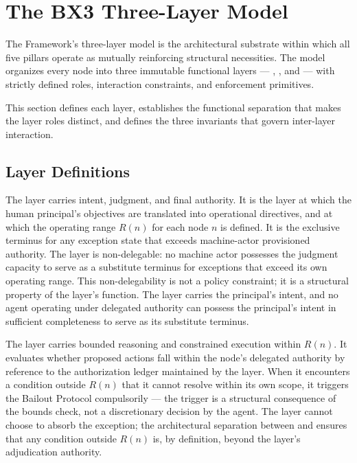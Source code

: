 \section{The BX3 Three-Layer Model}\label{sec:three-layer-model}

The \bxthree{} Framework's three-layer model is the architectural substrate
within which all five pillars operate as mutually reinforcing structural
necessities.  The model organizes every node into three immutable functional
layers --- \purpose{}, \bounds{}, and \fact{} --- with strictly defined roles,
interaction constraints, and enforcement primitives.

This section defines each layer, establishes the functional separation that
makes the layer roles distinct, and defines the three invariants that govern
inter-layer interaction.

\subsection{Layer Definitions}\label{sec:layer-definitions}

The \purpose{} layer carries intent, judgment, and final authority.  It is the
layer at which the human principal's objectives are translated into operational
directives, and at which the operating range $R(n)$ for each node $n$ is
defined.  It is the exclusive terminus for any exception state that exceeds
machine-actor provisioned authority.  The layer is non-delegable: no machine
actor possesses the judgment capacity to serve as a substitute terminus for
exceptions that exceed its own operating range.  This non-delegability is not a
policy constraint; it is a structural property of the layer's function.  The
\purpose{} layer carries the principal's intent, and no agent operating under
delegated authority can possess the principal's intent in sufficient
completeness to serve as its substitute terminus.

The \bounds{} layer carries bounded reasoning and constrained execution within
$R(n)$.  It evaluates whether proposed actions fall within the node's delegated
authority by reference to the authorization ledger maintained by the \fact{}
layer.  When it encounters a condition outside $R(n)$ that it cannot resolve
within its own scope, it triggers the Bailout Protocol compulsorily --- the
trigger is a structural consequence of the bounds check, not a discretionary
decision by the agent.  The \bounds{} layer cannot choose to absorb the
exception; the architectural separation between \purpose{} and \bounds{}
ensures that any condition outside $R(n)$ is, by definition, beyond the
\bounds{} layer's adjudication authority.

